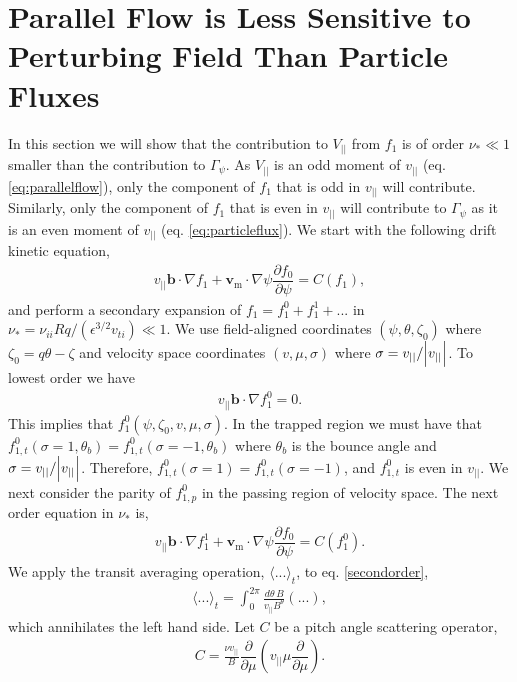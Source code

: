 \documentclass[aip, pop, preprint]{revtex4-1}
\numberwithin{figure}{section}
\numberwithin{equation}{section}
\newcommand{\partder}[2]{\dfrac{\partial  #1}{\partial  #2}} %
\begin{document}
\appendix

\section{Parallel Flow is Less Sensitive to Perturbing Field Than Particle Fluxes} \label{parallelflow}
In this section we will show that the contribution to $V_{||}$ from $f_1$ is of order $\nu_* \ll 1$ smaller than the contribution to $\Gamma_{\psi}$. As $V_{||}$ is an odd moment of $v_{||}$ (eq. \ref{eq:parallelflow}), only the component of $f_1$ that is odd in $v_{||}$ will contribute. Similarly, only the component of $f_1$ that is even in $v_{||}$ will contribute to $\Gamma_{\psi}$ as it is an even moment of $v_{||}$ (eq. \ref{eq:particleflux}). We start with the following drift kinetic equation,
\begin{gather}
v_{||} \bm{b} \cdot \nabla f_1 + \bm{v}_{\text{m}} \cdot \nabla \psi \partder{f_0}{\psi} = C(f_1),
\end{gather}
and perform a secondary expansion of $f_1 = f_1^0 + f_1^1 + ...$ in $\nu_* = \nu_{ii} Rq/(\epsilon^{3/2} v_{ti}) \ll 1$. We use field-aligned coordinates $(\psi, \theta, \zeta_0)$ where $\zeta_0 = q \theta - \zeta$ and velocity space coordinates $(v, \mu, \sigma)$ where $\sigma = v_{||}/\abs{v_{||}}$. To lowest order we have
\begin{gather}
v_{||} \bm{b} \cdot \nabla f_1^0 = 0.
\end{gather}
\label{firstorder}
This implies that $f_1^0(\psi, \zeta_0, v, \mu, \sigma)$. In the trapped region we must have that $f_{1,t}^0(\sigma = 1, \theta_b) = f_{1,t}^0(\sigma = -1, \theta_b)$ where $\theta_b$ is the bounce angle and $\sigma = v_{||}/\abs{v_{||}}$. Therefore, $f_{1,t}^0(\sigma = 1) = f_{1,t}^0(\sigma = -1)$, and $f_{1,t}^0$ is even in $v_{||}$. We next consider the parity of $f_{1,p}^0$ in the passing region of velocity space. The next order equation in $\nu_*$ is,
\begin{gather}
v_{||} \bm{b} \cdot \nabla f_1^1 + \bm{v}_{\text{m}} \cdot \nabla \psi \partder{f_0}{\psi} = C(f_1^0).
\label{secondorder}
\end{gather}
We apply the transit averaging operation, $\langle ... \rangle_t$, to eq. \ref{secondorder},
\begin{gather}
\langle ... \rangle_t = \int_0^{2\pi} \frac{d \theta \, B}{v_{||} B^{\theta}} (...),
\end{gather}
which annihilates the left hand side. Let $C$ be a pitch angle scattering operator,
\begin{gather}
C = \frac{\nu v_{||}}{B} \partder{}{\mu} \left( v_{||} \mu \partder{}{\mu} \right).
\end{gather}
\end{document}
